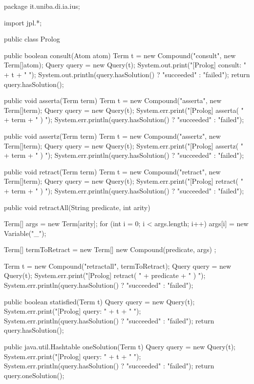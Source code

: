   \begin{javacode}
  package it.uniba.di.ia.ius;
  
  import jpl.*;
  
  public class Prolog {
    
    public boolean consult(Atom atom) {
      Term t = new Compound("consult", new Term[]{atom});
      Query query = new Query(t);
      System.out.print("[Prolog] consult: " + t + " ");
      System.out.println(query.hasSolution() ? "succeeded" : "failed");
      return query.hasSolution();
    }
    
    public void asserta(Term term) {
      Term t = new Compound("asserta", new Term[]{term});
      Query query = new Query(t);
      System.err.print("[Prolog] asserta( " + term + " ) ");
      System.err.println(query.hasSolution() ? "succeeded" : "failed");
    }
    
    public void assertz(Term term) {
      Term t = new Compound("assertz", new Term[]{term});
      Query query = new Query(t);
      System.err.print("[Prolog] assertz( " + term + " ) ");
      System.err.println(query.hasSolution() ? "succeeded" : "failed");
    }
    
    public void retract(Term term) {
      Term t = new Compound("retract", new Term[]{term});
      Query query = new Query(t);
      System.err.print("[Prolog] retract( " + term + " ) ");
      System.err.println(query.hasSolution() ? "succeeded" : "failed");
    }
    
    public void retractAll(String predicate, int arity) {
      
      Term[] args = new Term[arity];
      for (int i = 0; i < args.length; i++)
      args[i] = new Variable("_");
      
      Term[] termToRetract = new Term[]{ new Compound(predicate, args) };
      
      Term t = new Compound("retractall", termToRetract);
      Query query = new Query(t);
      System.err.print("[Prolog] retract( " + predicate + " ) ");
      System.err.println(query.hasSolution() ? "succeeded" : "failed");
    }
    
    public boolean statisfied(Term t) {
      Query query = new Query(t);
      System.err.print("[Prolog] query: " + t + " ");
      System.err.println(query.hasSolution() ? "succeeded" : "failed");
      return query.hasSolution();
    }
    
    public java.util.Hashtable oneSolution(Term t) {
      Query query = new Query(t);
      System.err.print("[Prolog] query: " + t + " ");
      System.err.println(query.hasSolution() ? "succeeded" : "failed");
      return query.oneSolution();
    }
    
}
\end{javacode}
